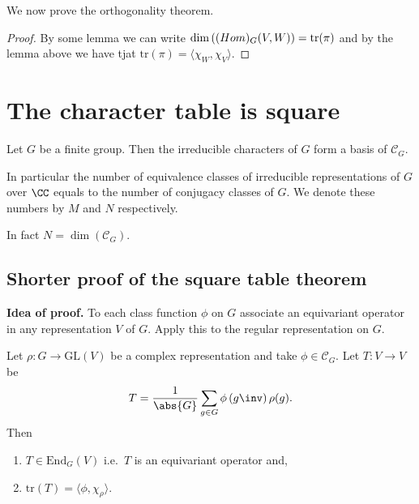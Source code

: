 \documentclass[12pt, a4paper]{article}
\newcommand{\gl}{\text{GL}}
\begin{document}
We now prove the orthogonality theorem.

\begin{proof}
    By some lemma we can write \(\dim\left( \text(Hom)_G(V,W) \right) = \text{tr}(\pi)\) and by the lemma above we have tjat \(\text{tr}(\pi)=\langle \chi_W, \chi_V \rangle\). 
\end{proof}

\section{The character table is square}

\begin{mdthm}
    Let \(G\) be a finite group. Then the irreducible characters of \(G\) form a basis of \(\mathcal{C}_G\).

    In particular the number of equivalence classes of irreducible representations of \(G\) over \(\CC\) equals to the number of conjugacy classes of \(G\). We denote these numbers by \(M\) and \(N\) respectively.
\end{mdthm}

\begin{mdremark}
    In fact \(N = \dim(\mathcal{C}_G)\).
\end{mdremark}

\subsection{Shorter proof of the square table theorem}

\textbf{Idea of proof.} To each class function \(\phi\) on \(G\) associate an equivariant operator in any representation \(V\) of \(G\). Apply this to the regular representation on \(G\).

\begin{lemma}
    Let \(\rho: G \to \gl(V)\) be a complex representation and take \(\phi\in \mathcal{C}_G\). Let \(T : V \to V\) be 
    \[T = \frac{1}{\abs{G}} \sum_{g\in G} \phi\left( g\inv \right) \rho(g).\]
    Then 
    \begin{enumerate}
        \item \(T \in \text{End}_G(V)\) i.e.\ \(T\) is an equivariant operator and,
        \item \(\text{tr}(T)=\langle \phi,\chi_\rho\rangle\).
    \end{enumerate}
\end{lemma}
\end{document}
